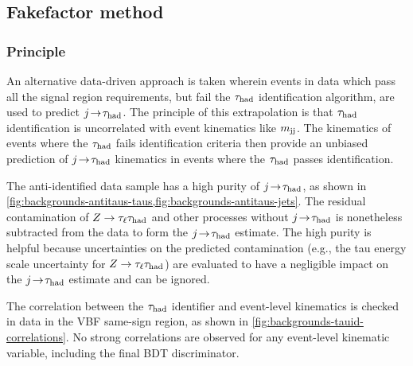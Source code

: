 \subsection{Fakefactor method}

\subsubsection{Principle}

An alternative data-driven approach is taken wherein events in data which pass all the signal region requirements, but fail the $\tau_\text{had}$ identification algorithm, are used to predict $j\!\rightarrow\!\tau_\text{had}$. The principle of this extrapolation is that $\tau_\text{had}$ identification is uncorrelated with event kinematics like $m_{\text{jj}}$. The kinematics of events where the $\tau_\text{had}$ fails identification criteria then provide an unbiased prediction of $j\!\rightarrow\!\tau_\text{had}$ kinematics in events where the $\tau_\text{had}$ passes identification.

The anti-identified data sample has a high purity of $j\!\rightarrow\!\tau_\text{had}$, as shown in \cref{fig:backgrounds-antitaus-taus,fig:backgrounds-antitaus-jets}. The residual contamination of $Z\rightarrow\tau_\ell\tau_\text{had}$ and other processes without $j\!\rightarrow\!\tau_\text{had}$ is nonetheless subtracted from the data to form the $j\!\rightarrow\!\tau_\text{had}$ estimate. The high purity is helpful because uncertainties on the predicted contamination (e.g., the tau energy scale uncertainty for $Z\rightarrow\tau_\ell\tau_\text{had}$) are evaluated to have a negligible impact on the $j\!\rightarrow\!\tau_\text{had}$ estimate and can be ignored.

The correlation between the $\tau_\text{had}$ identifier and event-level kinematics is checked in data in the VBF same-sign region, as shown in \cref{fig:backgrounds-tauid-correlations}. No strong correlations are observed for any event-level kinematic variable, including the final BDT discriminator.

\clearpage

